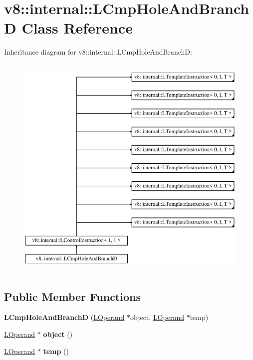 \hypertarget{classv8_1_1internal_1_1_l_cmp_hole_and_branch_d}{}\section{v8\+:\+:internal\+:\+:L\+Cmp\+Hole\+And\+BranchD Class Reference}
\label{classv8_1_1internal_1_1_l_cmp_hole_and_branch_d}
Inheritance diagram for v8\+:\+:internal\+:\+:L\+Cmp\+Hole\+And\+BranchD\+:\begin{figure}[H]
\begin{center}
\leavevmode
\includegraphics[height=11.000000cm]{classv8_1_1internal_1_1_l_cmp_hole_and_branch_d}
\end{center}
\end{figure}
\subsection*{Public Member Functions}
\begin{DoxyCompactItemize}
\item 
{\bfseries L\+Cmp\+Hole\+And\+BranchD} (\hyperlink{classv8_1_1internal_1_1_l_operand}{L\+Operand} $\ast$object, \hyperlink{classv8_1_1internal_1_1_l_operand}{L\+Operand} $\ast$temp)\hypertarget{classv8_1_1internal_1_1_l_cmp_hole_and_branch_d_a11d8bd1275c29dc3b042c00ba268c605}{}\label{classv8_1_1internal_1_1_l_cmp_hole_and_branch_d_a11d8bd1275c29dc3b042c00ba268c605}

\item 
\hyperlink{classv8_1_1internal_1_1_l_operand}{L\+Operand} $\ast$ {\bfseries object} ()\hypertarget{classv8_1_1internal_1_1_l_cmp_hole_and_branch_d_a072f5804a0ca03dafdc7353ae2ef790c}{}\label{classv8_1_1internal_1_1_l_cmp_hole_and_branch_d_a072f5804a0ca03dafdc7353ae2ef790c}

\item 
\hyperlink{classv8_1_1internal_1_1_l_operand}{L\+Operand} $\ast$ {\bfseries temp} ()\hypertarget{classv8_1_1internal_1_1_l_cmp_hole_and_branch_d_a88acfc4d64dd6c126eddd4afb227bb64}{}\label{classv8_1_1internal_1_1_l_cmp_hole_and_branch_d_a88acfc4d64dd6c126eddd4afb227bb64}

\end{DoxyCompactItemize}
